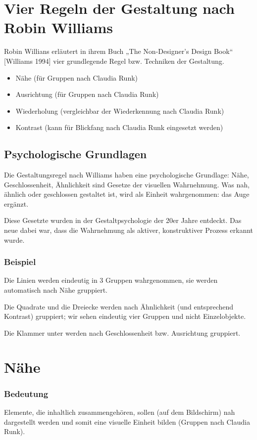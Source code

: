 \section{Vier Regeln der Gestaltung nach Robin Williams}
Robin Willians erläutert in ihrem Buch „The Non-Designer's Design Book“ [Williams 1994] vier grundlegende Regel bzw. Techniken der Gestaltung.
\begin{itemize}
\item Nähe (für Gruppen nach Claudia Runk)
\item Ausrichtung (für Gruppen nach Claudia Runk)
\item Wiederholung (vergleichbar der Wiederkennung nach Claudia Runk)
\item Kontrast (kann für Blickfang nach Claudia Runk eingesetzt werden)
\end{itemize}

\subsection{Psychologische Grundlagen}
Die Gestaltungsregel nach Williams haben eine psychologische Grundlage: Nähe, Geschlossenheit, Ähnlichkeit sind Gesetze der visuellen Wahrnehmung. Was nah, ähnlich oder geschlossen gestaltet ist, wird als Einheit wahrgenommen: das Auge ergänzt.
 
Diese Gesetzte wurden in der Gestaltpsychologie der 20er Jahre entdeckt. Das neue dabei war, dass die Wahrnehmung als aktiver, konstruktiver Prozess erkannt wurde.
\subsubsection{Beispiel}
Die Linien werden eindeutig in 3 Gruppen wahrgenommen, sie werden automatisch nach Nähe gruppiert.

Die Quadrate und die Dreiecke werden nach Ähnlichkeit (und entsprechend Kontrast) gruppiert; wir sehen eindeutig vier Gruppen und nicht Einzelobjekte.

Die Klammer unter werden nach Geschlossenheit bzw. Ausrichtung gruppiert.

\section{Nähe}
\subsubsection*{Bedeutung}
Elemente, die inhaltlich zusammengehören, sollen (auf dem Bildschirm) nah dargestellt werden und somit eine visuelle Einheit bilden (Gruppen nach Claudia Runk).

